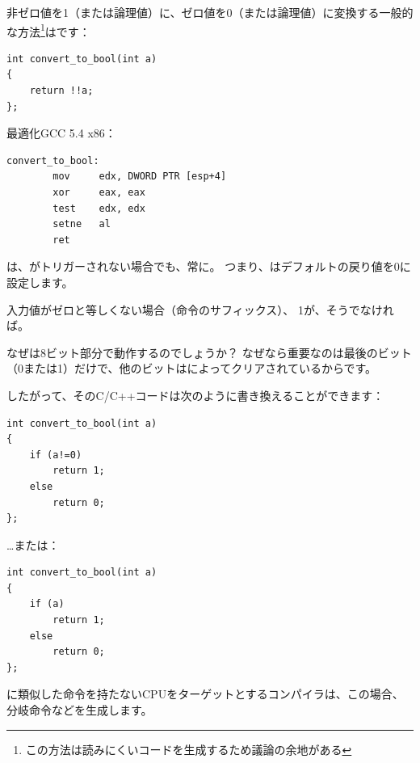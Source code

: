 
非ゼロ値を1（または論理値）に、ゼロ値を0（または論理値）に変換する一般的な方法\footnote{この方法は読みにくいコードを生成するため議論の余地がある}はです：

\begin{lstlisting}[style=customc]
int convert_to_bool(int a)
{
	return !!a;
};
\end{lstlisting}

最適化GCC 5.4 x86：

\begin{lstlisting}[style=customasmx86]
convert_to_bool:
        mov     edx, DWORD PTR [esp+4]
        xor     eax, eax
        test    edx, edx
        setne   al
        ret
\end{lstlisting}

は、がトリガーされない場合でも、常に。
つまり、はデフォルトの戻り値を0に設定します。

入力値がゼロと等しくない場合（命令のサフィックス）、
1が、そうでなければ。

なぜは8ビット部分で動作するのでしょうか？
なぜなら重要なのは最後のビット（0または1）だけで、他のビットはによってクリアされているからです。

したがって、そのC/C++コードは次のように書き換えることができます：

\begin{lstlisting}[style=customc]
int convert_to_bool(int a)
{
	if (a!=0)
		return 1;
	else
		return 0;
};
\end{lstlisting}

\dots または：

\begin{lstlisting}[style=customc]
int convert_to_bool(int a)
{
	if (a)
		return 1;
	else
		return 0;
};
\end{lstlisting}

に類似した命令を持たない\ac{CPU}をターゲットとするコンパイラは、この場合、
分岐命令などを生成します。
